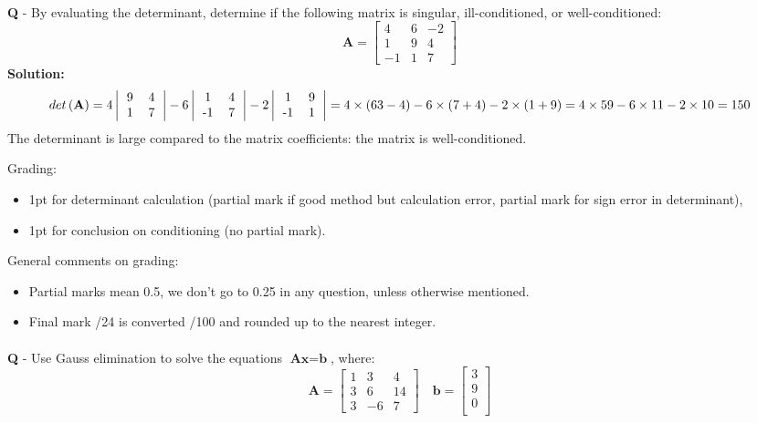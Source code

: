 \documentclass{llncs}
\newcounter{ques}
\newcommand{\myspace}[0]{\vspace*{0.25cm}}
\renewcommand{\question}[1]{\paragraph{}\textbf{Q\theques} - #1\stepcounter{ques} }
\newcommand{\answer}[1]{\color{red}\textbf{Solution:}\\#1\color{black}}
\begin{document}
\myspace

\myspace

\hrulefill

\newpage
\question{By evaluating the determinant, determine if the following matrix is singular, ill-conditioned, or well-conditioned:
$$
\textbf{A}= 
\begin{bmatrix}
4 & 6 & -2 \\
1 & 9 & 4 \\
-1 & 1 & 7
\end{bmatrix}
$$
}
\answer{
$$
det\left( \textbf{A} \right) = 4 \left| 
\begin{tabular}{cc}
9 & 4 \\
1 & 7
\end{tabular}
 \right|
 - 6 \left| \begin{tabular}{cc}
 1 & 4 \\
 -1 & 7
 \end{tabular}
 \right|
 - 2 \left| \begin{tabular}{cc}
 1 & 9 \\
 -1 & 1
 \end{tabular}
 \right|
 = 4 \times (63 - 4) - 6 \times (7 + 4) -2 \times (1 + 9)
 = 4 \times 59 - 6 \times 11 - 2 \times 10 = 150
$$
The determinant is large compared to the matrix coefficients: the matrix
is well-conditioned.

Grading:
\begin{itemize}
\item 1pt for determinant calculation (partial mark if good method but calculation error, partial mark for sign error in determinant),
\item 1pt for conclusion on conditioning (no partial mark).
\end{itemize}

General comments on grading:
\begin{itemize}
\item Partial marks mean 0.5, we don't go to 0.25 in any question, unless otherwise mentioned.
\item Final mark /24 is converted /100 and rounded up to the nearest integer.
\end{itemize}
}



\newpage
\question{Use Gauss elimination to solve the equations $\textbf{Ax}=\textbf{b}$, where:
$$
\textbf{A}= 
\begin{bmatrix}
1 & 3 & 4 \\
3 & 6 & 14 \\
3 & -6 & 7
\end{bmatrix}
\quad
\textbf{b}= 
\begin{bmatrix}
3  \\
9  \\
0  \\
\end{bmatrix}
$$
}
\end{document}
